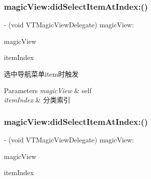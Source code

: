 \subsubsection{\texorpdfstring{magic\+View\+:did\+Select\+Item\+At\+Index\+:()}{magicView:didSelectItemAtIndex:()}\hspace{0.1cm}{\footnotesize\ttfamily [1/3]}}
{\footnotesize\ttfamily -\/ (void V\+T\+Magic\+View\+Delegate) magic\+View\+: \begin{DoxyParamCaption}\item[{(\mbox{\hyperlink{interface_v_t_magic_view}{V\+T\+Magic\+View}} $\ast$)}]{magic\+View }\item[{didSelectItemAtIndex:(N\+S\+U\+Integer)}]{item\+Index }\end{DoxyParamCaption}\hspace{0.3cm}{\ttfamily [optional]}}

选中导航菜单item时触发


\begin{DoxyParams}{Parameters}
{\em magic\+View} & self \\
\hline
{\em item\+Index} & 分类索引 \\
\hline
\end{DoxyParams}
\mbox{\label{protocol_v_t_magic_view_delegate_01-p_aa2799cd468eca3c1ebbcab8dcb375717}} 
\subsubsection{\texorpdfstring{magic\+View\+:did\+Select\+Item\+At\+Index\+:()}{magicView:didSelectItemAtIndex:()}\hspace{0.1cm}{\footnotesize\ttfamily [2/3]}}
{\footnotesize\ttfamily -\/ (void V\+T\+Magic\+View\+Delegate) magic\+View\+: \begin{DoxyParamCaption}\item[{(\mbox{\hyperlink{interface_v_t_magic_view}{V\+T\+Magic\+View}} $\ast$)}]{magic\+View }\item[{didSelectItemAtIndex:(N\+S\+U\+Integer)}]{item\+Index }\end{DoxyParamCaption}\hspace{0.3cm}{\ttfamily [optional]}}


